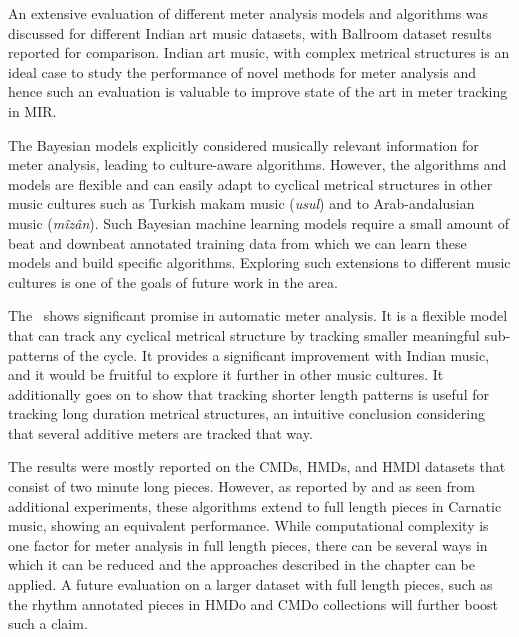An extensive evaluation of different meter analysis models and algorithms was discussed for different Indian art music datasets, with Ballroom dataset results reported for comparison. Indian art music, with complex metrical structures is an ideal case to study the performance of novel methods for meter analysis and hence such an evaluation is valuable to improve state of the art in meter tracking in \gls{MIR}. %

The Bayesian models explicitly considered musically relevant information for meter analysis, leading to culture-aware algorithms. However, the algorithms and models are flexible and can easily adapt to cyclical metrical structures in other music cultures such as Turkish makam music (\textit{usul}) and to Arab-andalusian music (\textit{mîzân}). Such Bayesian machine learning models require a small amount of beat and downbeat annotated training data from which we can learn these models and build specific algorithms. Exploring such extensions to different music cultures is one of the goals of future work in the area. 

The \spmodel\ shows significant promise in automatic meter analysis. It is a flexible model that can track any cyclical metrical structure by tracking smaller meaningful sub-patterns of the cycle. It provides a significant improvement with Indian music, and it would be fruitful to explore it further in other music cultures. It additionally goes on to show that tracking shorter length patterns is useful for tracking long duration metrical structures, an intuitive conclusion considering that several additive meters are tracked that way. 

The results were mostly reported on the \acrshort{CMDs}, \acrshort{HMDs}, and \acrshort{HMDl} datasets that consist of two minute long pieces. However, as reported by  and as seen from additional experiments, these algorithms extend to full length pieces in Carnatic music, showing an equivalent performance. While computational complexity is one factor for meter analysis in full length pieces, there can be several ways in which it can be reduced and the approaches described in the chapter can be applied. A future evaluation on a larger dataset with full length pieces, such as the rhythm annotated pieces in \acrshort{HMDo} and \acrshort{CMDo} collections will further boost such a claim. 


